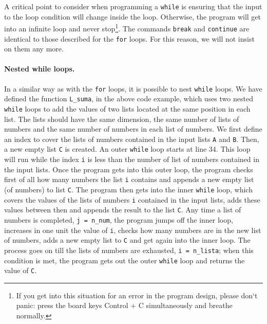 \begin{paracol}{2}
A critical point to consider when programming a \texttt{while} is ensuring that the input to the loop condition will change inside the loop. Otherwise, the program will get into an infinite loop and never stop\footnote{If you get into this situation for an error in the program design, please don`t panic: press the board keys Control + C simultaneously and breathe normally.}. The commands \texttt{break} and \texttt{continue} are identical to those described for the \texttt{for} loops. For this reason, we will not insist on them any more. 

\paragraph{Nested while loops.} In a similar way as with the \texttt{for} loops, it is possible to nest \texttt{while} loops. We have defined the function \texttt{L_suma}, in the above code example, which uses two nested \texttt{while} loops to add the values of two lists located at the same position in each list. The lists should have the same dimension, the same number of lists of numbers and the same number of numbers in each list of numbers. We first define an index to cover the lists of numbers contained in the input lists \texttt{A} and \texttt{B}. Then, a new empty list \texttt{C} is created. An outer \texttt{while} loop starts at line $34$. This loop will run while the index \texttt{i} is less than the number of list of numbers contained in the input lists. Once the program gets into this outer loop, the program checks first of all how many numbers the list \texttt{i} contains and appends a new empty list (of numbers) to list \texttt{C}. The program then gets into the inner \texttt{while} loop, which covers the values of the lists of numbers \texttt{i} contained in the input lists, adds these values between then and appends the result to the list \texttt{C}. Any time a list of numbers is completed, \texttt{j = n_num}, the program jumps off the inner loop, increases in one unit the value of \texttt{i}, checks how many numbers are in the new list of numbers, adds a new empty list to \texttt{C} and get again into the inner loop. The process goes on till the lists of numbers are exhausted, \texttt{i = n_lista}; when this condition is met, the program gets out the outer \texttt{while} loop and returns the value of \texttt{C}.
\end{paracol}

